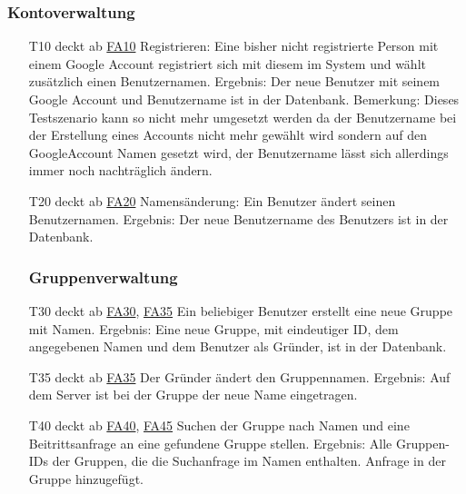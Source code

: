 \documentclass{scrartcl}
\begin{document}
\subsubsection{Kontoverwaltung}
\begin{itemize} 
	\item[T10] deckt ab \hyperlink{FA10}{FA10} \newline
	Registrieren: Eine bisher nicht registrierte Person mit einem Google Account registriert sich mit diesem im System und wählt zusätzlich einen Benutzernamen. \newline
	Ergebnis: Der neue Benutzer mit seinem Google Account und Benutzername ist in der Datenbank. \newline
	Bemerkung: Dieses Testszenario kann so nicht mehr umgesetzt werden da der Benutzername bei der Erstellung eines Accounts nicht mehr gewählt wird sondern auf den GoogleAccount Namen gesetzt wird, der Benutzername lässt sich allerdings immer noch nachträglich ändern.
	
	\item[T20] deckt ab \hyperlink{FA20}{FA20}\newline
	Namensänderung: Ein Benutzer ändert seinen Benutzernamen. \newline
	Ergebnis: Der neue Benutzername des Benutzers ist in der Datenbank. 
	
	\subsubsection{Gruppenverwaltung}
	
	\item[T30] deckt ab \hyperlink{FA30}{FA30}, \hyperlink{FA35}{FA35}\newline
	Ein beliebiger Benutzer erstellt eine neue Gruppe mit Namen. \newline
	Ergebnis: Eine neue Gruppe, mit eindeutiger ID, dem angegebenen Namen und dem Benutzer als Gründer, ist in der Datenbank.
	
	\item[T35] deckt ab \hyperlink{FA35}{FA35} \newline
	Der Gründer ändert den Gruppennamen.\newline
	Ergebnis: Auf dem Server ist bei der Gruppe der neue Name eingetragen. 
	
	\item[T40] deckt ab \hyperlink{FA40}{FA40}, \hyperlink{FA45}{FA45}  \newline
	Suchen der Gruppe nach Namen und eine Beitrittsanfrage an eine gefundene Gruppe stellen. \newline
	Ergebnis: Alle Gruppen-IDs der Gruppen, die die Suchanfrage im Namen enthalten. Anfrage in der Gruppe 		
	hinzugefügt.
	

\end{itemize}
\end{document}
